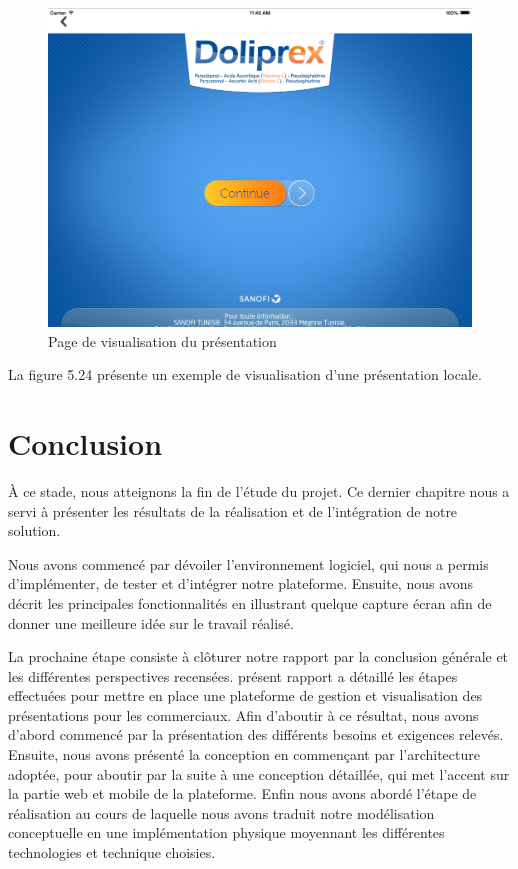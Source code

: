 \documentclass[12pt, ChapStyle1, oneside]{./Styles/Dea_Gsm}
\begin{document}
\begin{figure}[H]
    \centering
    \includegraphics[width=6in]{screenshots/a4}
    \caption{Page de visualisation du présentation}
\end{figure}
La figure 5.24 présente un exemple de visualisation d'une présentation locale.




\section{Conclusion}
À ce stade, nous atteignons la fin de l'étude du projet. Ce dernier chapitre nous a servi à présenter les résultats de la réalisation et de l’intégration de notre solution.


Nous avons commencé par dévoiler l’environnement logiciel, qui nous a permis d’implémenter, de tester et d’intégrer notre plateforme.
Ensuite, nous avons décrit les principales fonctionnalités en illustrant quelque capture écran afin de donner une meilleure idée sur le travail réalisé.


La prochaine étape consiste à clôturer notre rapport par la conclusion générale et les différentes perspectives recensées.
 \label{Conclusion}
 présent rapport a détaillé les étapes effectuées pour mettre en place une plateforme de gestion et visualisation des présentations pour les commerciaux. Afin d’aboutir à ce résultat, nous avons d’abord commencé par la présentation des différents besoins et exigences relevés. Ensuite, nous avons présenté la conception en commençant par l’architecture adoptée, pour aboutir par la suite à une conception détaillée, qui met l’accent sur la partie web et mobile de la plateforme. Enfin nous avons abordé l’étape de réalisation au cours de laquelle nous avons traduit notre modélisation conceptuelle en une implémentation physique moyennant les différentes technologies et technique choisies.
\end{document}
